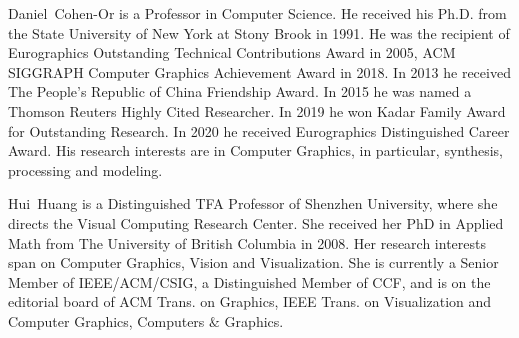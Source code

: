\documentclass[10pt,journal,compsoc]{IEEEtran}
\begin{document}
\begin{IEEEbiography}{Daniel~Cohen-Or}
	is a Professor in Computer Science. He received his Ph.D. from the State University of New York at Stony Brook in 1991. He was the recipient of Eurographics Outstanding Technical Contributions Award in 2005, ACM SIGGRAPH Computer Graphics Achievement Award in 2018. In 2013 he received The People’s Republic of China Friendship Award. In 2015 he was named a Thomson Reuters Highly Cited Researcher. In 2019 he won Kadar Family Award for Outstanding Research. In 2020 he received Eurographics Distinguished Career Award. His research interests are in Computer Graphics, in particular, synthesis, processing and modeling. 
\end{IEEEbiography}


\begin{IEEEbiography}{Hui~Huang}
	 is a Distinguished TFA Professor of Shenzhen University, where she directs the Visual Computing Research Center. She received her PhD in Applied Math from The University of British Columbia in 2008. Her research interests span on Computer Graphics, Vision and Visualization. She is currently a Senior Member of IEEE/ACM/CSIG, a Distinguished Member of CCF, and is on the editorial board of ACM Trans. on Graphics, IEEE Trans. on Visualization and Computer Graphics, Computers $\&$ Graphics.
\end{IEEEbiography}
\end{document}
